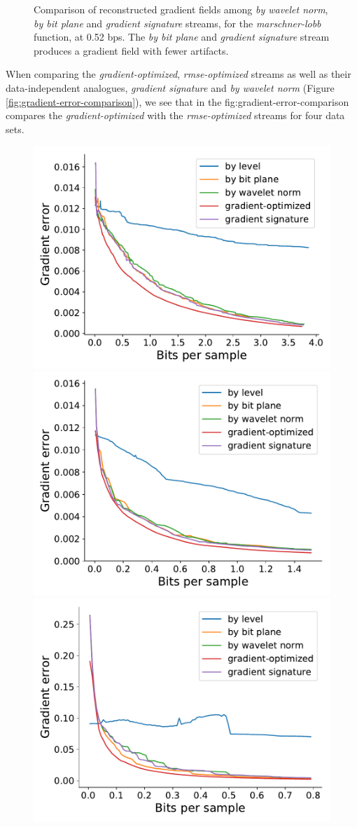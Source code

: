 \begin{figure}
	\caption{Comparison of reconstructed gradient fields among \emph{by wavelet norm}, \emph{by bit
	plane} and \emph{gradient signature} streams, for the \emph{marschner-lobb} function, at 0.52 bps.
	The \emph{by bit plane} and \emph{gradient signature} stream produces a gradient field with fewer
	artifacts.}
  \label{fig:gradient-rendering}
\end{figure}

When comparing the \emph{gradient-optimized}, \emph{rmse-optimized} streams as well as their
data-independent analogues, \emph{gradient signature} and \emph{by wavelet norm} (Figure
\ref{fig:gradient-error-comparison}), we see that in the {fig:gradient-error-comparison} compares
the \emph{gradient-optimized} with the \emph{rmse-optimized} streams for four data sets.

\begin{figure}
	\centering
	{\includegraphics[width=0.48\linewidth]{img/gradient/5points/gradient-optimized-boiler.pdf}}
	{\includegraphics[width=0.48\linewidth]{img/gradient/5points/gradient-optimized-diffusivity.pdf}}
	{\includegraphics[width=0.48\linewidth]{img/gradient/5points/gradient-optimized-euler.pdf}}

\end{figure}
